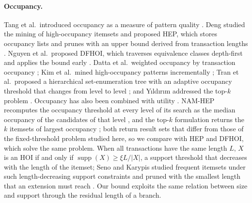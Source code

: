 \documentclass[pdflatex,sn-mathphys,Numbered]{sn-jnl}
\theoremstyle{thmstyleone}
\theoremstyle{thmstyletwo}
\theoremstyle{thmstylethree}
\newcommand{\supp}{\operatorname{supp}}
\begin{document}
\paragraph{Occupancy.}
Tang et al.\ introduced occupancy as a measure of pattern quality \cite{tang2012occupancy}. Deng studied the mining of high-occupancy itemsets and proposed HEP, which stores occupancy lists and prunes with an upper bound derived from transaction lengths \cite{deng2020hoi}. Nguyen et al.\ proposed DFHOI, which traverses equivalence classes depth-first and applies the bound early \cite{nguyen2023dfhoi}. Datta et al.\ weighted occupancy by transaction occupancy \cite{datta2022hoimto}; Kim et al.\ mined high-occupancy patterns incrementally \cite{kim2022incremental}; Tran et al.\ proposed a hierarchical set-enumeration tree with an adaptive occupancy threshold that changes from level to level \cite{tran2025namhep}; and Y{\i}ld{\i}r{\i}m addressed the top-$k$ problem \cite{yildirim2025topk}. Occupancy has also been combined with utility \cite{gan2020huopm,kumar2024hauopm,cho2024incremental}. NAM-HEP recomputes the occupancy threshold at every level of its search as the median occupancy of the candidates of that level \cite{tran2025namhep}, and the top-$k$ formulation returns the $k$ itemsets of largest occupancy \cite{yildirim2025topk}; both return result sets that differ from those of the fixed-threshold problem studied here, so we compare with HEP and DFHOI, which solve the same problem. When all transactions have the same length $L$, $X$ is an HOI if and only if $\supp(X) \ge \xi L / |X|$, a support threshold that decreases with the length of the itemset; Seno and Karypis studied frequent itemsets under such length-decreasing support constraints and pruned with the smallest length that an extension must reach \cite{seno2005ldsc}. Our bound exploits the same relation between size and support through the residual length of a branch.
\end{document}
